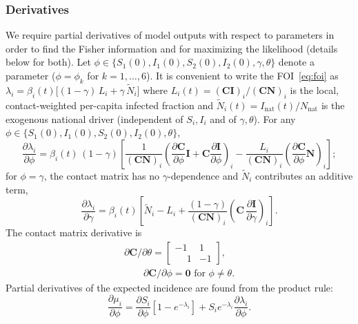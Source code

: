 \documentclass[11pt]{article}
\begin{document}
\subsubsection{Derivatives}\label{subsub:sens}
We require partial derivatives of model outputs with respect to
parameters in order to find the Fisher information and for maximizing
the likelihood (details below for both). Let $\phi \in \{S_1(0),
I_1(0), S_2(0), I_2(0), \gamma, \theta\}$ denote a parameter ($\phi =
\phi_k$ for $k = 1, \dots, 6$). It is convenient to write the
FOI~\eqref{eq:foi} as $\lambda_i = \beta_i(t)\bigl[(1-\gamma)\,L_i +
  \gamma\,\tilde{N}_i\bigr]$ where $L_i(t) =
(\mathbf{C}\mathbf{I})_i/(\mathbf{C}\mathbf{N})_i$ is the local,
contact-weighted per-capita infected fraction and $\tilde{N}_i(t) =
I_{\text{nat}}(t)/N_{\text{nat}}$ is the exogenous national driver
(independent of $S_i, I_i$ and of $\gamma, \theta$).  For any $\phi
\in \{S_1(0), I_1(0), S_2(0), I_2(0), \theta\}$,
\begin{equation}\label{eq:sens_foi}
\frac{\partial \lambda_i}{\partial \phi} = \beta_i(t)\,(1-\gamma)\left[
\frac{1}{(\mathbf{C}\mathbf{N})_i}\left(
  \frac{\partial \mathbf{C}}{\partial \phi} \mathbf{I}
  + \mathbf{C} \frac{\partial \mathbf{I}}{\partial \phi}\right)_i
- \frac{L_i}{(\mathbf{C}\mathbf{N})_i}
  \left(\frac{\partial \mathbf{C}}{\partial \phi} \mathbf{N}\right)_i
\right];
\end{equation}
for $\phi = \gamma$, the contact matrix has no $\gamma$-dependence and
$\tilde{N}_i$ contributes an additive term,
\begin{equation}\label{eq:sens_foi_alpha}
\frac{\partial \lambda_i}{\partial \gamma} = \beta_i(t)\left[
\tilde{N}_i - L_i
+ \frac{(1-\gamma)}{(\mathbf{C}\mathbf{N})_i}
\left(\mathbf{C}\,\frac{\partial \mathbf{I}}{\partial \gamma}\right)_i
\right].
\end{equation}
The contact matrix derivative is
\begin{align*}
\partial \mathbf{C}/\partial \theta =
\begin{bmatrix}
  -1 &  1 \\
  \phantom{-}1 & -1
\end{bmatrix},\\
\qquad
\partial \mathbf{C}/\partial \phi = \mathbf{0} \text{ for } \phi \neq \theta.
\end{align*}
Partial derivatives of the expected incidence are found from the
product rule:
\begin{equation}\label{eq:sens_mu}
  \frac{\partial \mu_i}{\partial \phi} =
  \frac{\partial S_i}{\partial \phi} [1 - e^{-\lambda_i}] + S_i
  e^{-\lambda_i} \frac{\partial \lambda_i}{\partial \phi}.
\end{equation}
\end{document}
